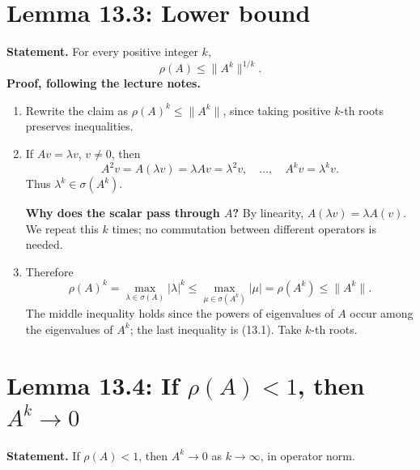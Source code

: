 \documentclass[11pt,a4paper]{article}
\newenvironment{proofsteps}{\begin{enumerate}\setlength{\itemsep}{4pt}}{\end{enumerate}}
\begin{document}
\section{Lemma 13.3: Lower bound}
\textbf{Statement.} For every positive integer \(k\),
\[
 \boxed{\rho(A)\leq\|A^k\|^{1/k}.}
\]
\textbf{Proof, following the lecture notes.}
\begin{proofsteps}
\item Rewrite the claim as \(\rho(A)^k\leq\|A^k\|\), since taking positive \(k\)-th roots preserves inequalities.
\item If \(Av=\lambda v\), \(v\neq0\), then
\[
 A^2v=A(\lambda v)=\lambda Av=\lambda^2v,\quad\ldots,\quad
 A^kv=\lambda^kv.
\]
Thus \(\lambda^k\in\sigma(A^k)\).
\begin{personalnote}
\textbf{Why does the scalar pass through \(A\)?} By linearity, \(A(\lambda v)=\lambda A(v)\). We repeat this \(k\) times; no commutation between different operators is needed.
\end{personalnote}
\item Therefore
\[
 \rho(A)^k=\max_{\lambda\in\sigma(A)}|\lambda|^k
 \leq\max_{\mu\in\sigma(A^k)}|\mu|
 =\rho(A^k)\leq\|A^k\|.
\]
The middle inequality holds since the powers of eigenvalues of \(A\) occur among the eigenvalues of \(A^k\); the last inequality is (13.1). Take \(k\)-th roots.
\end{proofsteps}

\section{Lemma 13.4: If \(\rho(A)<1\), then \(A^k\to0\)}
\textbf{Statement.} If \(\rho(A)<1\), then \(A^k\to0\) as \(k\to\infty\), in operator norm.
\end{document}
